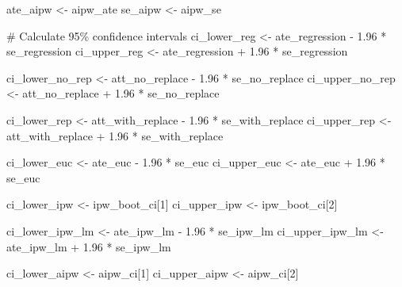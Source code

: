\documentclass[
  letterpaper,
  DIV=11,
  numbers=noendperiod]{scrartcl}
\newenvironment{Shaded}{\begin{snugshade}}{\end{snugshade}}
\newcommand{\CommentTok}[1]{\textcolor[rgb]{0.37,0.37,0.37}{#1}}
\newcommand{\DecValTok}[1]{\textcolor[rgb]{0.68,0.00,0.00}{#1}}
\newcommand{\FloatTok}[1]{\textcolor[rgb]{0.68,0.00,0.00}{#1}}
\newcommand{\NormalTok}[1]{\textcolor[rgb]{0.00,0.23,0.31}{#1}}
\newcommand{\OtherTok}[1]{\textcolor[rgb]{0.00,0.23,0.31}{#1}}
\newcommand{\SpecialCharTok}[1]{\textcolor[rgb]{0.37,0.37,0.37}{#1}}
\begin{document}
\begin{Shaded}
\begin{Highlighting}[]
\NormalTok{ate\_aipw }\OtherTok{\textless{}{-}}\NormalTok{ aipw\_ate}
\NormalTok{se\_aipw }\OtherTok{\textless{}{-}}\NormalTok{ aipw\_se}

\CommentTok{\# Calculate 95\% confidence intervals}
\NormalTok{ci\_lower\_reg }\OtherTok{\textless{}{-}}\NormalTok{ ate\_regression }\SpecialCharTok{{-}} \FloatTok{1.96} \SpecialCharTok{*}\NormalTok{ se\_regression}
\NormalTok{ci\_upper\_reg }\OtherTok{\textless{}{-}}\NormalTok{ ate\_regression }\SpecialCharTok{+} \FloatTok{1.96} \SpecialCharTok{*}\NormalTok{ se\_regression}

\NormalTok{ci\_lower\_no\_rep }\OtherTok{\textless{}{-}}\NormalTok{ att\_no\_replace }\SpecialCharTok{{-}} \FloatTok{1.96} \SpecialCharTok{*}\NormalTok{ se\_no\_replace}
\NormalTok{ci\_upper\_no\_rep }\OtherTok{\textless{}{-}}\NormalTok{ att\_no\_replace }\SpecialCharTok{+} \FloatTok{1.96} \SpecialCharTok{*}\NormalTok{ se\_no\_replace}

\NormalTok{ci\_lower\_rep }\OtherTok{\textless{}{-}}\NormalTok{ att\_with\_replace }\SpecialCharTok{{-}} \FloatTok{1.96} \SpecialCharTok{*}\NormalTok{ se\_with\_replace}
\NormalTok{ci\_upper\_rep }\OtherTok{\textless{}{-}}\NormalTok{ att\_with\_replace }\SpecialCharTok{+} \FloatTok{1.96} \SpecialCharTok{*}\NormalTok{ se\_with\_replace}

\NormalTok{ci\_lower\_euc }\OtherTok{\textless{}{-}}\NormalTok{ ate\_euc }\SpecialCharTok{{-}} \FloatTok{1.96} \SpecialCharTok{*}\NormalTok{ se\_euc}
\NormalTok{ci\_upper\_euc }\OtherTok{\textless{}{-}}\NormalTok{ ate\_euc }\SpecialCharTok{+} \FloatTok{1.96} \SpecialCharTok{*}\NormalTok{ se\_euc}

\NormalTok{ci\_lower\_ipw }\OtherTok{\textless{}{-}}\NormalTok{ ipw\_boot\_ci[}\DecValTok{1}\NormalTok{]}
\NormalTok{ci\_upper\_ipw }\OtherTok{\textless{}{-}}\NormalTok{ ipw\_boot\_ci[}\DecValTok{2}\NormalTok{]}

\NormalTok{ci\_lower\_ipw\_lm }\OtherTok{\textless{}{-}}\NormalTok{ ate\_ipw\_lm }\SpecialCharTok{{-}} \FloatTok{1.96} \SpecialCharTok{*}\NormalTok{ se\_ipw\_lm}
\NormalTok{ci\_upper\_ipw\_lm }\OtherTok{\textless{}{-}}\NormalTok{ ate\_ipw\_lm }\SpecialCharTok{+} \FloatTok{1.96} \SpecialCharTok{*}\NormalTok{ se\_ipw\_lm}

\NormalTok{ci\_lower\_aipw }\OtherTok{\textless{}{-}}\NormalTok{ aipw\_ci[}\DecValTok{1}\NormalTok{]}
\NormalTok{ci\_upper\_aipw }\OtherTok{\textless{}{-}}\NormalTok{ aipw\_ci[}\DecValTok{2}\NormalTok{]}


\end{Highlighting}
\end{Shaded}
\end{document}
